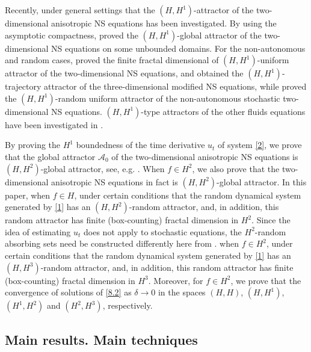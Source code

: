\documentclass{elsarticle}
\theoremstyle{definition}
\numberwithin{equation}{section}
\newcommand{\A}{\mathcal{A}}
\begin{document}
Recently, under general settings that the $(H,H^1)$-attractor of the two-dimensional anisotropic  NS equations has been investigated. By using the asymptotic compactness, \cite{ju} proved the $(H,H^1)$-global attractor of the two-dimensional NS equations on some unbounded domains. For the non-autonomous and random cases, \cite{cui21jde} proved the finite fractal dimensional of $(H,H^1)$-uniform attractor of the two-dimensional NS equations, and \cite{zhao22} obtained the $(H,H^1)$-trajectory attractor of the three-dimensional modified NS equations, while \cite{li} proved the $(H,H^1)$-random uniform attractor of the non-autonomous stochastic two-dimensional NS equations. $(H,H^1)$-type attractors of the other fluids equations have been investigated in \cite{gu,wang2024,wang2023,xu}.

By proving the $H^1$ boundedness of the time derivative $u_t$ of system \eqref{2}, we prove that the global attractor $\A_0$ of the  two-dimensional anisotropic  NS equations is $(H,H^2)$-global attractor, see, e.g. \cite{song}. When $f\in H^2$, we also prove that the  two-dimensional anisotropic  NS equations in fact is $(H,H^2)$-global attractor.  In this paper, when $f\in H$, under certain conditions that the random dynamical system generated by \eqref{1} has  an $(H,H^2)$-random attractor, and, in addition, this random attractor  has finite (box-counting) fractal dimension in $H^2$.  Since the  idea of estimating $u_t$  does not apply to stochastic equations,  the $H^2$-random absorbing sets need be constructed differently here from \cite{song}. when $f\in H^2$, under certain conditions that the random dynamical system generated by \eqref{1} has  an $(H,H^3)$-random attractor, and, in addition, this random attractor  has finite (box-counting) fractal dimension in $H^3$. Moreover, for $f\in H^2$, we prove that the convergence of solutions of \eqref{8.2}  as $\delta\rightarrow0$ in the spaces $(H,H)$, $(H,H^1)$, $(H^1,H^2)$ and $(H^2,H^3)$, respectively.

\subsection*{Main results. Main techniques}
\end{document}
